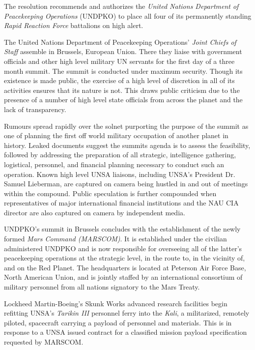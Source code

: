 The resolution recommends and authorizes the {\it United Nations Department of Peacekeeping Operations} (UNDPKO) to place all four of its permanently standing {\it Rapid Reaction Force} battalions on high alert.
\StopTimelineDate

The United Nations Department of Peacekeeping Operations' {\it Joint Chiefs of Staff} assemble in Brussels, European Union. There they liaise with government officials and other high level military UN servants for the first day of a three month summit. The summit is conducted under maximum security. Though its existence is made public, the exercise of a high level of discretion in all of its activities ensures that its nature is not. This draws public criticism due to the presence of a number of high level state officials from across the planet and the lack of transparency.

Rumours spread rapidly over the solnet purporting the purpose of the summit as one of planning the first off world military occupation of another planet in history. Leaked documents suggest the summits agenda is to assess the feasibility, followed by addressing the preparation of all strategic, intelligence gathering, logistical, personnel, and financial planning necessary to conduct such an operation. Known high level UNSA liaisons, including UNSA's President Dr. Samuel Lieberman, are captured on camera being hustled in and out of meetings within the compound. Public speculation is further compounded when representatives of major international financial institutions and the NAU CIA director are also captured on camera by independent media.
\StopTimelineDate

UNDPKO's summit in Brussels concludes with the establishment of the newly formed {\it Mars Command (MARSCOM)}. It is established under the civilian administered UNDPKO and is now responsible for overseeing all of the latter's peacekeeping operations at the strategic level, in the route to, in the vicinity of, and on the Red Planet. The headquarters is located at Peterson Air Force Base, North American Union, and is jointly staffed by an international consortium of military personnel from all nations signatory to the Mars Treaty.
\StopTimelineDate

Lockheed Martin-Boeing's Skunk Works advanced research facilities begin refitting UNSA's {\it Tarikin III} personnel ferry into the {\it Kali}, a militarized, remotely piloted, spacecraft carrying a payload of personnel and materials. This is in response to a UNSA issued contract for a classified mission payload specification requested by MARSCOM.
\StopTimelineDate

